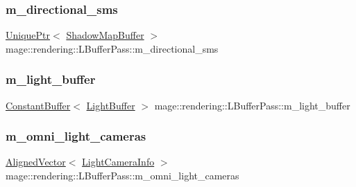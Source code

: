 \subsubsection{\texorpdfstring{m\+\_\+directional\+\_\+sms}{m\_directional\_sms}}
{\footnotesize\ttfamily \hyperlink{namespacemage_a3316d7143a973e37adf1110f2e80ca31}{Unique\+Ptr}$<$ \hyperlink{classmage_1_1rendering_1_1_shadow_map_buffer}{Shadow\+Map\+Buffer} $>$ mage\+::rendering\+::\+L\+Buffer\+Pass\+::m\+\_\+directional\+\_\+sms\hspace{0.3cm}{\ttfamily [private]}}

\hypertarget{classmage_1_1rendering_1_1_l_buffer_pass_ab80d18b8193e90588afa5e992b5b1af8}{}\label{classmage_1_1rendering_1_1_l_buffer_pass_ab80d18b8193e90588afa5e992b5b1af8} 
\subsubsection{\texorpdfstring{m\+\_\+light\+\_\+buffer}{m\_light\_buffer}}
{\footnotesize\ttfamily \hyperlink{classmage_1_1rendering_1_1_constant_buffer}{Constant\+Buffer}$<$ \hyperlink{structmage_1_1rendering_1_1_light_buffer}{Light\+Buffer} $>$ mage\+::rendering\+::\+L\+Buffer\+Pass\+::m\+\_\+light\+\_\+buffer\hspace{0.3cm}{\ttfamily [private]}}

\hypertarget{classmage_1_1rendering_1_1_l_buffer_pass_acf230dbad022cf28a4b87c38ff3439d1}{}\label{classmage_1_1rendering_1_1_l_buffer_pass_acf230dbad022cf28a4b87c38ff3439d1} 
\subsubsection{\texorpdfstring{m\+\_\+omni\+\_\+light\+\_\+cameras}{m\_omni\_light\_cameras}}
{\footnotesize\ttfamily \hyperlink{namespacemage_a8664bfb5ce2179fc64eae9f82c8a5ba8}{Aligned\+Vector}$<$ \hyperlink{structmage_1_1rendering_1_1_l_buffer_pass_1_1_light_camera_info}{Light\+Camera\+Info} $>$ mage\+::rendering\+::\+L\+Buffer\+Pass\+::m\+\_\+omni\+\_\+light\+\_\+cameras\hspace{0.3cm}{\ttfamily [private]}}

